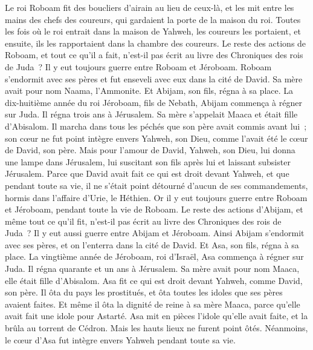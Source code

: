 \begin{multicols}{2}
Le roi Roboam fit des boucliers d'airain au lieu de ceux-là, et les mit entre les mains des chefs des coureurs, qui gardaient la porte de la maison du roi.
Toutes les fois où le roi entrait dans la maison de Yahweh, les coureurs les portaient, et ensuite, ils les rapportaient dans la chambre des coureurs.
Le reste des actions de Roboam, et tout ce qu'il a fait, n'est-il pas écrit au livre des Chroniques des rois de Juda~?
Il y eut toujours guerre entre Roboam et Jéroboam.
Roboam s'endormit avec ses pères et fut enseveli avec eux dans la cité de David. Sa mère avait pour nom Naama, l'Ammonite. Et Abijam, son fils, régna à sa place.
\VerseOne{}La dix-huitième année du roi Jéroboam, fils de Nebath, Abijam commença à régner sur Juda.
Il régna trois ans à Jérusalem. Sa mère s'appelait Maaca et était fille d'Abisalom.
Il marcha dans tous les péchés que son père avait commis avant lui~; son cœur ne fut point intègre envers Yahweh, son Dieu, comme l'avait été le cœur de David, son père.
Mais pour l'amour de David, Yahweh, son Dieu, lui donna une lampe dans Jérusalem, lui suscitant son fils après lui et laissant subsister Jérusalem.
Parce que David avait fait ce qui est droit devant Yahweh, et que pendant toute sa vie, il ne s'était point détourné d'aucun de ses commandements, hormis dans l'affaire d'Urie, le Héthien.
Or il y eut toujours guerre entre Roboam et Jéroboam, pendant toute la vie de Roboam.
Le reste des actions d'Abijam, et même tout ce qu'il fit, n'est-il pas écrit au livre des Chroniques des rois de Juda~? Il y eut aussi guerre entre Abijam et Jéroboam.
Ainsi Abijam s'endormit avec ses pères, et on l'enterra dans la cité de David. Et Asa, son fils, régna à sa place.
La vingtième année de Jéroboam, roi d'Israël, Asa commença à régner sur Juda.
Il régna quarante et un ans à Jérusalem. Sa mère avait pour nom Maaca, elle était fille d'Abisalom.
Asa fit ce qui est droit devant Yahweh, comme David, son père.
Il ôta du pays les prostitués, et ôta toutes les idoles que ses pères avaient faites.
Et même il ôta la dignité de reine à sa mère Maaca, parce qu'elle avait fait une idole pour Astarté. Asa mit en pièces l'idole qu'elle avait faite, et la brûla au torrent de Cédron.
Mais les hauts lieux ne furent point ôtés. Néanmoins, le cœur d'Asa fut intègre envers Yahweh pendant toute sa vie.

\end{multicols}
